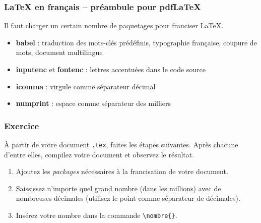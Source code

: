 \begin{frame}[fragile]

\frametitle{{\LaTeX} en français -- préambule pour pdf\LaTeX}

Il faut charger un certain nombre de paquetages pour franciser {\LaTeX}.


\pause

\begin{itemize}
	\item \textbf{babel} : traduction des mots-clés prédéfinis, typographie française, coupure de mots, document multilingue
	
	\pause
	
	\item \textbf{inputenc} et \textbf{fontenc} : lettres accentuées dans le code source
	
	\pause
	
	\item \textbf{icomma} : virgule comme séparateur décimal
	
	\pause
	
	\item \textbf{numprint} : espace comme séparateur des milliers
\end{itemize}
\end{frame}


\begin{frame}[c,fragile]

	\frametitle{Exercice \thenoExercice}
	
	À partir de votre document \texttt{.tex}, faites les étapes suivantes. Après chacune d'entre elles,
	compilez votre document et observez le résultat.
	
	\begin{enumerate}
		\item Ajoutez les \emph{packages} nécessaires à la francisation de votre document.
		\item Saississez n'importe quel grand nombre (dans les millions) avec de nombreuses décimales (utilisez le point comme séparateur de décimales).
		\item Insérez votre nombre dans la commande \lstinline|\nombre{}|.
	\end{enumerate}
\end{frame}


